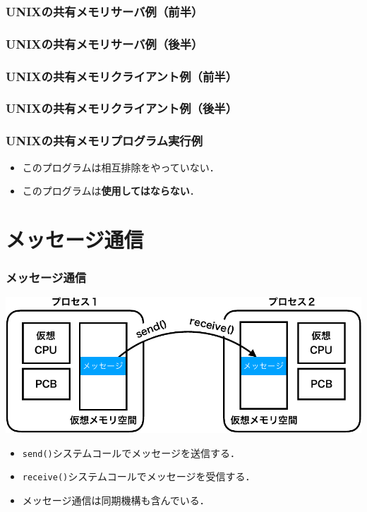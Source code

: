 \documentclass[dvipdfmx]{beamer}
\begin{document}
\begin{frame}
  \frametitle{UNIXの共有メモリサーバ例（前半）}
  
\end{frame}

\begin{frame}
  \frametitle{UNIXの共有メモリサーバ例（後半）}
  
\end{frame}

\begin{frame}
  \frametitle{UNIXの共有メモリクライアント例（前半）}
  
\end{frame}

\begin{frame}
  \frametitle{UNIXの共有メモリクライアント例（後半）}
  
\end{frame}

\begin{frame}
  \frametitle{UNIXの共有メモリプログラム実行例}
  
  \begin{itemize}
  \item このプログラムは相互排除をやっていない．
  \item このプログラムは{\bf 使用してはならない}．
  \end{itemize}
\end{frame}

\section{メッセージ通信}
\begin{frame}
  \frametitle{メッセージ通信}
  \begin{center}
    \includegraphics[scale=0.6]{Fig/ipcMessagePassing-crop.pdf}
  \end{center}
  \begin{itemize}
  \item {\tt send()}システムコールでメッセージを送信する．
  \item {\tt receive()}システムコールでメッセージを受信する．
  \item メッセージ通信は同期機構も含んでいる．
  \end{itemize}
\end{frame}
\end{document}
